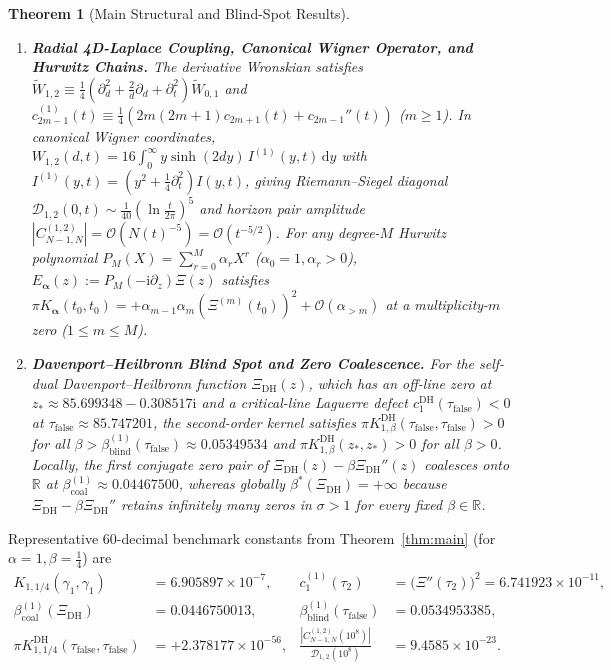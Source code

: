 \documentclass[11pt,reqno]{amsart}
\newtheorem{theorem}{Theorem}[section]
\theoremstyle{definition}
\theoremstyle{remark}
\numberwithin{equation}{section}
\newcommand{\R}{\mathbb{R}}
\newcommand{\dd}{\mathrm{d}}
\newcommand{\ii}{\mathrm{i}}
\begin{document}
\begin{theorem}[Main Structural and Blind-Spot Results]
\begin{enumerate}[label=\textup{(\roman*)},leftmargin=2.2em]
\item \textbf{Radial 4D-Laplace Coupling, Canonical Wigner Operator, and Hurwitz Chains.} The derivative Wronskian satisfies $\widetilde{W}_{1,2} \equiv \frac{1}{4}(\partial_d^2 + \frac{2}{d}\partial_d + \partial_t^2)\widetilde{W}_{0,1}$ and $c_{2m-1}^{(1)}(t) \equiv \frac{1}{4}(2m(2m+1)c_{2m+1}(t) + c_{2m-1}''(t))$ ($m \ge 1$). In canonical Wigner coordinates, $W_{1,2}(d,t) = 16\int_0^\infty y\sinh(2dy)\,I^{(1)}(y,t)\,\dd y$ with $I^{(1)}(y,t) = (y^2 + \frac{1}{4}\partial_t^2)I(y,t)$, giving Riemann--Siegel diagonal $\mathcal{D}_{1,2}(0,t) \sim \frac{1}{40}(\ln\frac{t}{2\pi})^5$ and horizon pair amplitude $|C_{N-1,N}^{(1,2)}| = \mathcal{O}(N(t)^{-5}) = \mathcal{O}(t^{-5/2})$. For any degree-$M$ Hurwitz polynomial $P_M(X) = \sum_{r=0}^M \alpha_r X^r$ ($\alpha_0 = 1, \alpha_r > 0$), $E_{\boldsymbol{\alpha}}(z) := P_M(-\ii\partial_z)\Xi(z)$ satisfies $\pi K_{\boldsymbol{\alpha}}(t_0, t_0) = +\alpha_{m-1}\alpha_m(\Xi^{(m)}(t_0))^2 + \mathcal{O}(\alpha_{>m})$ at a multiplicity-$m$ zero ($1 \le m \le M$).
\item \textbf{Davenport--Heilbronn Blind Spot and Zero Coalescence.} For the self-dual Davenport--Heilbronn function $\Xi_{\mathrm{DH}}(z)$, which has an off-line zero at $z_* \approx 85.699348 - 0.308517\ii$ and a critical-line Laguerre defect $c_1^{\mathrm{DH}}(\tau_{\mathrm{false}}) < 0$ at $\tau_{\mathrm{false}} \approx 85.747201$, the second-order kernel satisfies $\pi K_{1,\beta}^{\mathrm{DH}}(\tau_{\mathrm{false}}, \tau_{\mathrm{false}}) > 0$ for all $\beta > \beta_{\mathrm{blind}}^{(1)}(\tau_{\mathrm{false}}) \approx 0.05349534$ and $\pi K_{1,\beta}^{\mathrm{DH}}(z_*, z_*) > 0$ for all $\beta > 0$. Locally, the first conjugate zero pair of $\Xi_{\mathrm{DH}}(z) - \beta\Xi_{\mathrm{DH}}''(z)$ coalesces onto $\R$ at $\beta_{\mathrm{coal}}^{(1)} \approx 0.04467500$, whereas globally $\beta^*(\Xi_{\mathrm{DH}}) = +\infty$ because $\Xi_{\mathrm{DH}} - \beta\Xi_{\mathrm{DH}}''$ retains infinitely many zeros in $\sigma > 1$ for every fixed $\beta \in \R$.
\end{enumerate}
\end{theorem}

Representative $60$-decimal benchmark constants from Theorem~\ref{thm:main} (for $\alpha = 1, \beta = \frac{1}{4}$) are
\begin{equation}\label{eq:canonical_constants}
\begin{aligned}
K_{1,1/4}(\gamma_1, \gamma_1) &= 6.905897 \times 10^{-7}, & c_1^{(1)}(\tau_2) &= \bigl(\Xi''(\tau_2)\bigr)^2 = 6.741923 \times 10^{-11}, \\
\beta_{\mathrm{coal}}^{(1)}(\Xi_{\mathrm{DH}}) &= 0.0446750013, & \beta_{\mathrm{blind}}^{(1)}(\tau_{\mathrm{false}}) &= 0.0534953385, \\
\pi K_{1,1/4}^{\mathrm{DH}}(\tau_{\mathrm{false}}, \tau_{\mathrm{false}}) &= +2.378177 \times 10^{-56}, & \frac{|C_{N-1,N}^{(1,2)}(10^8)|}{\mathcal{D}_{1,2}(10^8)} &= 9.4585 \times 10^{-23}.
\end{aligned}
\end{equation}
\end{document}
